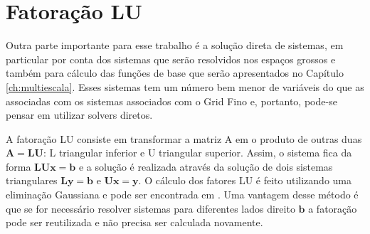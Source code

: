 
\section{Fatoração LU} \label{sec:fatoracaolu}

Outra parte importante para esse trabalho é a solução direta de sistemas, em particular por conta dos sistemas que serão resolvidos nos espaços grossos e também para cálculo das funções de base que serão apresentados no Capítulo \ref{ch:multiescala}. Esses sistemas tem um número bem menor de variáveis do que as associadas com os sistemas associados com o Grid Fino e, portanto, pode-se pensar em utilizar solvers diretos.

A fatoração LU consiste em transformar a matriz A em o produto de outras duas $\mathbf{A}=\mathbf{L}\mathbf{U}$: L triangular inferior e U triangular superior. Assim, o sistema fica da forma $\mathbf{L} \mathbf{U} \mathbf{x} = \mathbf{b}$ e a solução é realizada através da solução de dois sistemas triangulares $\mathbf{L}\mathbf{y} = \mathbf{b}$ e $\mathbf{U}\mathbf{x} = \mathbf{y}$. O cálculo dos fatores LU é feito utilizando uma eliminação Gaussiana e pode ser encontrada em \citet{heath1997scientific}. Uma vantagem desse método é que se for necessário resolver sistemas para diferentes lados direito $\mathbf{b}$ a fatoração pode ser reutilizada e não precisa ser calculada novamente. 